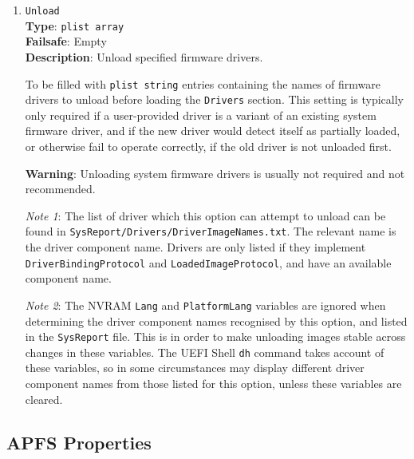 \documentclass[]{article}
\begin{document}
\begin{enumerate}
\item
  \texttt{Unload}\\
  \textbf{Type}: \texttt{plist\ array}\\
  \textbf{Failsafe}: Empty\\
  \textbf{Description}: Unload specified firmware drivers.

  To be filled with \texttt{plist\ string} entries containing
  the names of firmware drivers to unload before loading the
  \texttt{Drivers} section.
  This setting is typically only required if a user-provided driver is a variant of
  an existing system firmware driver, and if the new driver would detect itself
  as partially loaded, or otherwise fail to operate correctly, if the old
  driver is not unloaded first.

  \textbf{Warning}: Unloading system firmware drivers is usually not required
  and not recommended.

  \emph{Note 1}: The list of driver which this option can attempt to unload
  can be found in \texttt{SysReport/Drivers/DriverImageNames.txt}.
  The relevant name is the driver component name. Drivers are only listed if they
  implement \texttt{DriverBindingProtocol} and \texttt{LoadedImageProtocol},
  and have an available component name.

  \emph{Note 2}: The NVRAM \texttt{Lang} and \texttt{PlatformLang} variables
  are ignored when determining the driver component names recognised by this
  option, and listed in the \texttt{SysReport} file. This is in order to make
  unloading images stable across changes in these variables.
  The UEFI Shell \texttt{dh} command takes account of these variables,
  so in some circumstances may display different driver component names from
  those listed for this option, unless these variables are cleared.

\end{enumerate}

\subsection{APFS Properties}\label{uefiapfsprops}
\end{document}
